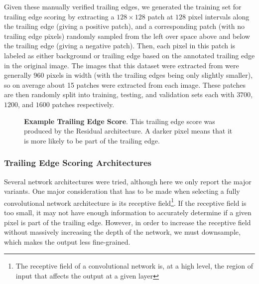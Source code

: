 Given these manually verified trailing edges, we generated the training set for trailing edge scoring by extracting a $128 \times 128$ patch at $128$ pixel intervals along the trailing edge (giving a positive patch), and a corresponding patch (with no trailing edge pixels) randomly sampled from the left over space above and below the trailing edge (giving a negative patch).
Then, each pixel in this patch is labeled as either background or trailing edge based on the annotated trailing edge in the original image.
The images that this dataset were extracted from were generally $960$ pixels in width (with the trailing edges being only slightly smaller), so on average about 15 patches were extracted from each image. 
These patches are then randomly split into training, testing, and validation sets each with $3700$, $1200$, and $1600$ patches respectively.



\begin{figure}[t]%
\centering
{}
\newline
{}
\caption{\textbf{Example Trailing Edge Score}. This trailing edge score was produced by the Residual architecture. A darker pixel means that it is more likely to be part of the trailing edge.}
\label{fig:example_te_score_annotres}
\end{figure}



\subsubsection{Trailing Edge Scoring Architectures} 
\label{sec:te_arch}

Several network architectures were tried, although here we only report the major variants.
One major consideration that has to be made when selecting a fully convolutional network architecture is its receptive field\footnote{The receptive field of a convolutional network is, at a high level, the region of input that affects the output at a given layer}.
If the receptive field is too small, it may not have enough information to accurately determine if a given pixel is part of the trailing edge.
However, in order to increase the receptive field without massively increasing the depth of the network, we must downsample, which makes the output less fine-grained.

